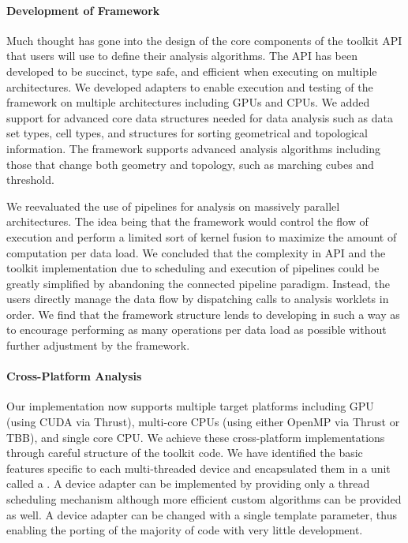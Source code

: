 \paragraph*{Development of Framework}

Much thought has gone into the design of the core components of the toolkit
API that users will use to define their analysis algorithms. The API has
been developed to be succinct, type safe, and efficient when executing on
multiple architectures. We developed adapters to enable execution and
testing of the framework on multiple architectures including GPUs and
CPUs. We added support for advanced core data structures needed for data
analysis such as data set types, cell types, and structures for sorting
geometrical and topological information. The framework supports advanced
analysis algorithms including those that change both geometry and topology,
such as marching cubes and threshold.
  
We reevaluated the use of pipelines for analysis on massively parallel
architectures. The idea being that the framework would control the flow of
execution and perform a limited sort of kernel fusion to maximize the
amount of computation per data load. We concluded that the complexity in
API and the toolkit implementation due to scheduling and execution of
pipelines could be greatly simplified by abandoning the connected pipeline
paradigm. Instead, the users directly manage the data flow by dispatching
calls to analysis worklets in order. We find that the framework structure
lends to developing in such a way as to encourage performing as many
operations per data load as possible without further adjustment by the
framework.

\paragraph*{Cross-Platform Analysis}

Our implementation now supports multiple target platforms including GPU
(using CUDA via Thrust), multi-core CPUs (using
either OpenMP via Thrust or TBB), and single core
CPU. We achieve these cross-platform implementations through careful
structure of the toolkit code. We have identified the basic features
specific to each multi-threaded device and encapsulated them in a unit
called a . A device adapter
can be implemented by providing only a thread scheduling mechanism although
more efficient custom algorithms can be provided as well. A device adapter
can be changed with a single template parameter, thus enabling the porting
of the majority of code with very little development.

